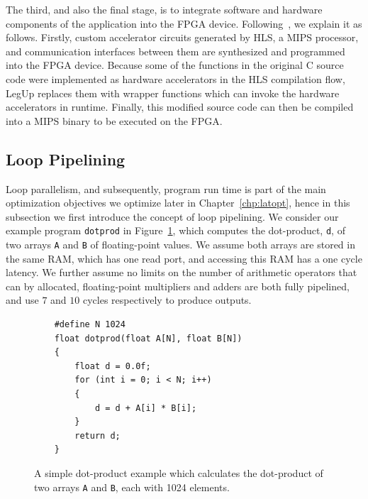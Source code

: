 The third, and also the final stage, is to integrate software and hardware
components of the application into the FPGA device.  Following~\cite{canis13},
we explain it as follows.  Firstly, custom accelerator circuits generated
by HLS, a MIPS processor, and communication interfaces between them are
synthesized and programmed into the FPGA device.  Because some of the functions
in the original C source code were implemented as hardware accelerators in the
HLS compilation flow, LegUp replaces them with wrapper functions which can
invoke the hardware accelerators in runtime.  Finally, this modified source
code can then be compiled into a MIPS binary to be executed on the FPGA\@.


\subsection{Loop Pipelining}
\label{bg:sub:pipelining}

Loop parallelism, and subsequently, program run time is part of the main
optimization objectives we optimize later in Chapter~\ref{chp:latopt}, hence in
this subsection we first introduce the concept of loop pipelining.  We consider
our example program \verb|dotprod| in Figure~\ref{bg:lst:dotprod}, which
computes the dot-product, \verb|d|, of two arrays \verb|A| and \verb|B| of
floating-point values.  We assume both arrays are stored in the same RAM, which
has one read port, and accessing this RAM has a one cycle latency.  We further
assume no limits on the number of arithmetic operators that can by allocated,
floating-point multipliers and adders are both fully pipelined, and use $7$ and
$10$ cycles respectively to produce outputs.
\begin{figure}[ht]
    \centering
    \begin{minipage}{0.7\textwidth}
    \begin{lstlisting}
    #define N 1024
    float dotprod(float A[N], float B[N])
    {
        float d = 0.0f;
        for (int i = 0; i < N; i++)
        {
            d = d + A[i] * B[i];
        }
        return d;
    }
    \end{lstlisting}
    \end{minipage}
    \caption{%
        A simple dot-product example which calculates the dot-product of two
        arrays \texttt{A} and \texttt{B}, each with 1024 elements.
    }\label{bg:lst:dotprod}
\end{figure}

